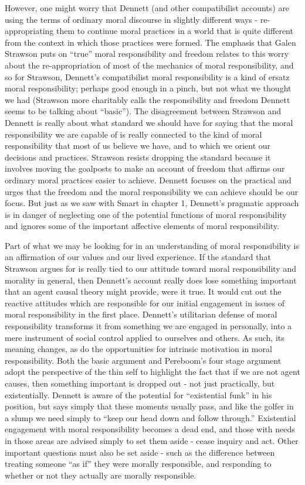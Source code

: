 \documentclass[phd,12pt,oneside,paper=letterpaper]{ubcthesis}
\begin{document}
However, one might worry that Dennett (and other compatibilist accounts) are using the terms of ordinary moral discourse in slightly different ways - re-appropriating them to continue moral practices in a world that is quite different from the context in which those practices were formed. The emphasis that Galen Strawson puts on ``true'' moral responsibility and freedom relates to this worry about the re-appropriation of most of the mechanics of moral responsibility, and so for Strawson, Dennett's compatibilist moral responsibility is a kind of ersatz moral responsibility; perhaps good enough in a pinch, but not what we thought we had (Strawson more charitably calls the responsibility and freedom Dennett seems to be talking about ``basic''). The disagreement between Strawson and Dennett is really about what standard we should have for saying that the moral responsibility we are capable of is really connected to the kind of moral responsibility that most of us believe we have, and to which we orient our decisions and practices. Strawson resists dropping the standard because it involves moving the goalposts to make an account of freedom that affirms our ordinary moral practices easier to achieve. Dennett focuses on the practical and urges that the freedom and the moral responsibility we can achieve should be our focus. But just as we saw with Smart in chapter 1, Dennett's pragmatic approach is in danger of neglecting one of the potential functions of moral responsibility and ignores some of the important affective elements of moral responsibility. 

Part of what we may be looking for in an understanding of moral responsibility is an affirmation of our values and our lived experience. If the standard that Strawson argues for is really tied to our attitude toward moral responsibility and morality in general, then Dennett's account really does lose something important that an agent causal theory might provide, were it true. It would cut out the reactive attitudes which are responsible for our initial engagement in issues of moral responsibility in the first place. Dennett's utilitarian defense of moral responsibility transforms it from something we are engaged in personally, into a mere instrument of social control applied to ourselves and others. As such, its meaning changes, as do the opportunities for intrinsic motivation in moral responsibility. Both the basic argument and Pereboom's four stage argument adopt the perspective of the thin self to highlight the fact that if we are not agent causes, then something important is dropped out - not just practically, but existentially. Dennett is aware of the potential for ``existential funk'' in his position, but says simply that these moments usually pass, and like the golfer in a slump we need simply to ``keep our head down and follow through.'' \citep[p.168]{dennett1984} Existential engagement with moral responsibility becomes a dead end, and those with needs in those areas are advised simply to set them aside - cease inquiry and act. Other important questions must also be set aside - such as the difference between treating someone ``as if'' they were morally responsible, and responding to whether or not they actually are morally responsible.
\end{document}
